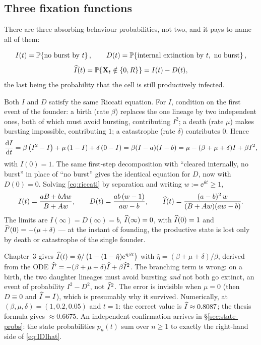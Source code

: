 \subsection{Three fixation functions}

There are three absorbing-behaviour probabilities, not two, and it pays to
name all of them:
\begin{definition}
\begin{equation}
I(t)=\mathbb{P}\!\left\{\text{no burst by }t\right\},\qquad
D(t)=\mathbb{P}\!\left\{\text{internal extinction by }t,\ \text{no burst}\right\},
\end{equation}
\begin{equation}
\widehat{I}(t)=\mathbb{P}\!\left\{{{\bf X}_t}\notin\{0,R\}\right\}=I(t)-D(t),
\end{equation}
the last being the probability that the cell is still productively infected.
\end{definition}

Both $I$ and $D$ satisfy the same Riccati equation. For $I$, condition on the
first event of the founder: a birth (rate $\beta$) replaces the one lineage
by two independent ones, both of which must avoid bursting, contributing
$I^2$; a death (rate $\mu$) makes bursting impossible, contributing $1$; a
catastrophe (rate $\delta$) contributes $0$. Hence
\begin{equation}
\displaystyle\frac{{\rm d} I}{{\rm d} t}=\beta\left( I^2-I\right)+\mu\left(1-I\right)+\delta\left(0-I\right)
=\beta(I-a)(I-b)=\mu-(\beta+\mu+\delta)I+\beta I^2,
\label{eq:riccati}
\end{equation}
with $I(0)=1$. The same first-step decomposition with ``cleared internally,
no burst'' in place of ``no burst'' gives the identical equation for $D$,
now with $D(0)=0$. Solving \eqref{eq:riccati} by separation and writing
$w:=\ee^{\theta t}\ge1$,
\begin{equation}
I(t)=\frac{aB+bAw}{B+Aw},\qquad
D(t)=\frac{ab\,(w-1)}{aw-b},\qquad
\widehat{I}(t)=\frac{(a-b)^2\,w}{(B+Aw)(aw-b)}.
\label{eq:IDIhat}
\end{equation}
The limits are $I(\infty)=D(\infty)=b$, $\widehat{I}(\infty)=0$, with
$\widehat{I}(0)=1$ and $\widehat{I}'(0)=-(\mu+\delta)$ --- at the instant of founding,
the productive state is lost only by death or catastrophe of the single
founder.

\begin{remark}
\label{rem:ihat}
Chapter~3 gives
$\widehat{I}(t)=\hat\eta/\left(1-(1-\hat\eta){\rm e}^{\hat\eta\beta t}\right)$ with
$\hat\eta=(\beta+\mu+\delta)/\beta$, derived from the ODE
$\widehat{I}'=-(\beta+\mu+\delta)\widehat{I}+\beta\widehat{I}^2$. The branching term is wrong:
on a birth, the two daughter lineages must avoid bursting \emph{and} not both
go extinct, an event of probability $I^2-D^2$, not $\widehat{I}^2$. The error is
invisible when $\mu=0$ (then $D\equiv0$ and $\widehat{I}=I$), which is presumably
why it survived. Numerically, at $(\beta,\mu,\delta)=(1,0.2,0.05)$ and
$t=1$: the correct value is $\widehat{I}\approx0.8087$; the thesis formula gives
$\approx0.6675$. An independent confirmation arrives in
\S\ref{sec:state-probs}: the state probabilities $p_n(t)$ sum over $n\ge1$
to exactly the right-hand side of \eqref{eq:IDIhat}.
\end{remark}

